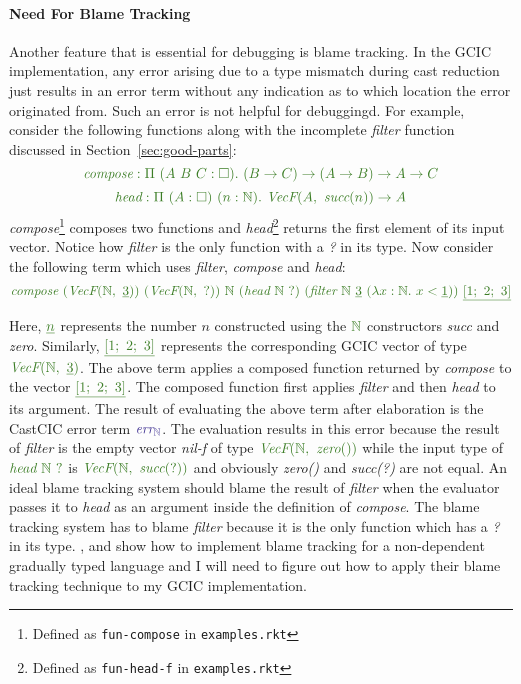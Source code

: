 \documentclass{article}
\theoremstyle{definition}
\newcommand{\Gcode}[1]{{\color{OliveGreen}\textit{#1}}}
\newcommand{\Gcmath}[1]{{\color{OliveGreen}#1}}
\newcommand{\Ccmath}[1]{{\color{BlueViolet}\boldsymbol{#1}}}
\begin{document}
\paragraph{Need For Blame Tracking}
Another feature that is essential for debugging is blame
tracking\cite{wadler_well-typed_2009}. In the GCIC implementation, any error
arising due to a type mismatch during cast reduction just results in an error
term without any indication as to which location the error originated from. Such
an error is not helpful for debuggingd. For example, consider the following
functions along with the incomplete \Gcode{filter} function discussed in
Section~\ref{sec:good-parts}:
\[ \Gcmath{\textit{compose} : \Pi\ (A\ B\ C: \square).\
  (B \to C) \to (A \to B) \to A \to C} \]
\[ \Gcmath{\textit{head} : \Pi\ (A: \square)\ (n: \mathbb{N}).\
  \textit{VecF}(A,\ \textit{succ}(n)) \to A} \] \Gcode{compose}\footnote{Defined
as \texttt{fun-compose} in \texttt{examples.rkt}} composes two functions and
\Gcode{head}\footnote{Defined as \texttt{fun-head-f} in \texttt{examples.rkt}}
returns the first element of its input vector. Notice how \Gcode{filter} is the
only function with a \Gcode{?} in its type. Now consider the following term
which uses \Gcode{filter}, \Gcode{compose} and \Gcode{head}:
\[ \Gcmath{\textit{compose}\ (\textit{VecF}(\mathbb{N},\ \underline{3}))\
                             (\textit{VecF}(\mathbb{N},\ ?))\ \mathbb{N}\
           (\textit{head}\ \mathbb{N}\ ?)\
           (\textit{filter}\ \mathbb{N}\ \underline{3}\
              (\lambda x:\mathbb{N}.\ x < \underline{1}))\
           \underline{[1;\ 2;\ 3]}} \]

Here, \(\Gcmath{\underline{n}}\) represents the number \(n\) constructed using
the \(\Gcmath{\mathbb{N}}\) constructors \Gcode{succ} and \Gcode{zero}.
Similarly, \(\Gcmath{\underline{[1;\ 2;\ 3]}}\) represents the corresponding
GCIC vector of type \(\Gcmath{\textit{VecF}(\mathbb{N},\ \underline{3})}\). The
above term applies a composed function returned by \Gcode{compose} to the vector
\(\Gcmath{\underline{[1;\ 2;\ 3]}}\). The composed function first applies
\Gcode{filter} and then \Gcode{head} to its argument. The result of evaluating
the above term after elaboration is the CastCIC error term
\(\Ccmath{\textit{err}_\mathbb{N}}\). The evaluation results in this error
because the result of \Gcode{filter} is the empty vector \Gcode{nil-f} of type
\(\Gcmath{\textit{VecF}(\mathbb{N},\ \textit{zero}())}\) while the input type of
\(\Gcmath{\textit{head}\ \mathbb{N}\ ?}\) is
\(\Gcmath{\textit{VecF}(\mathbb{N},\ \textit{succ}(?))}\) and obviously
\Gcode{zero()} and \Gcode{succ(?)} are not equal. An ideal blame tracking system
should blame the result of \Gcode{filter} when the evaluator passes it to
\Gcode{head} as an argument inside the definition of \Gcode{compose}. The blame
tracking system has to blame \Gcode{filter} because it is the only function
which has a \Gcode{?} in its type. \citet{wadler_well-typed_2009},
\citet{siek_blame_2021} and \citet{siek_refined_2015} show how to implement
blame tracking for a non-dependent gradually typed language and I will need to
figure out how to apply their blame tracking technique to my GCIC
implementation.
\end{document}
